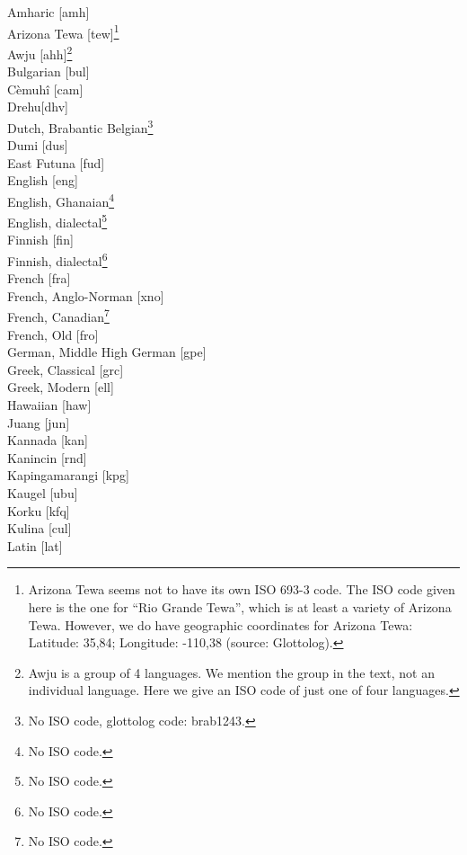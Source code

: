 ﻿\documentclass[output=paper,draft,draftmode,colorlinks,citecolor=brown]{langscibook}
\begin{document}
\begin{multicols}{2}
\noindent
Amharic [amh]\\
Arizona Tewa [tew]\footnote{Arizona Tewa seems not to have its own ISO 693-3
code. The ISO code given here is the one for ``Rio Grande Tewa'', which is at least a variety of Arizona Tewa. However, we do have
geographic coordinates for Arizona Tewa: Latitude: 35,84; Longitude: -110,38 (source:
Glottolog).}\\
Awju [ahh]\footnote{Awju is a group of 4 languages. We mention the group in the
text, not an individual language. Here we give an ISO code of just one of
four languages.}\\
Bulgarian [bul]\\
Cèmuhî [cam]\\
Drehu[dhv]\\
Dutch, Brabantic Belgian\footnote{No ISO code, glottolog code: brab1243.}\\
Dumi [dus]\\
East Futuna [fud]\\
English [eng]\\
English, Ghanaian\footnote{No ISO code.}\\
English, dialectal\footnote{No ISO code.}\\
Finnish [fin]\\
Finnish, dialectal\footnote{No ISO code.}\\
French [fra]\\
French, Anglo-Norman [xno]\\
French, Canadian\footnote{No ISO code.}\\
French, Old [fro]\\
German, Middle High German [gpe]\\
Greek, Classical [grc]\\
Greek, Modern [ell]\\
Hawaiian [haw]\\
Juang [jun]\\
Kannada [kan]\\
Kanincin [rnd]\\
Kapingamarangi [kpg]\\
Kaugel [ubu]\\
Korku [kfq]\\
Kulina [cul]\\
Latin [lat]\\

\end{multicols}
\end{document}
